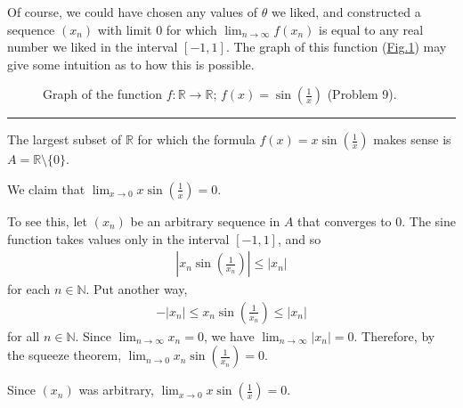 \documentclass[letterpaper,10pt,english]{jupyterBook}
\let\sphinxpxdimen\pdfpxdimen\else\newdimen\sphinxpxdimen
\begin{document}
Of course, we could have chosen any values of \(\theta\) we liked, and constructed a sequence \((x_n)\) with limit \(0\) for which \(\lim_{n\rightarrow\infty}f(x_n)\) is equal to any real number we liked in the interval \([-1,1]\). The graph of this function (\hyperref[\detokenize{Solutions-upto46:s1x}]{Fig.\@ \ref{\detokenize{Solutions-upto46:s1x}}}) may give some intuition as to how this is possible.

\begin{figure}[htbp]
\centering
\capstart

\noindent\sphinxincludegraphics[width=700\sphinxpxdimen]{{sin(1,x)}.png}
\caption{Graph of the function \(f:\mathbb{R}\to\mathbb{R}\); \(f(x)=\sin\left(\frac{1}{x}\right)\) (Problem 9).}\label{\detokenize{Solutions-upto46:s1x}}\end{figure}


\bigskip\hrule\bigskip


\sphinxAtStartPar
{\hyperref[\detokenize{Problems:id10}]{}} The largest subset of \(\mathbb{R}\) for which the formula \(f(x)=x\sin\left(\frac{1}{x}\right)\) makes sense is \(A = \mathbb{R} \setminus \{0\}\).

We claim that \(\displaystyle\lim_{x \rightarrow 0} x \sin\left(\frac{1}{x}\right) = 0\).

To see this, let \((x_{n})\) be an arbitrary sequence in \(A\) that converges to \(0\). The sine function takes values only in the interval \([-1,1]\), and so
\begin{equation*}
\begin{split}
\left|x_n\sin\left(\frac{1}{x_n}\right)\right| \leq |x_n|
\end{split}
\end{equation*}
\sphinxAtStartPar
for each \(n\in\mathbb{N}\). Put another way,
\begin{equation*}
\begin{split}
-|x_{n}| \leq x_{n}\sin\left(\frac{1}{x_n}\right) \leq |x_{n}|
\end{split}
\end{equation*}
\sphinxAtStartPar
for all \(n\in\mathbb{N}\). Since \(\displaystyle\lim_{n\to \infty} x_n=0\), we have \( \displaystyle\lim_{n\to \infty} |x_n| =0\). Therefore, by the squeeze theorem, \(\displaystyle\lim_{n\rightarrow 0}x_n\sin\left(\frac{1}{x_n}\right) = 0\).

Since \((x_n)\) was arbitrary, \(\displaystyle\lim_{x \rightarrow 0} x \sin\left(\frac{1}{x}\right) = 0\).
\end{document}
